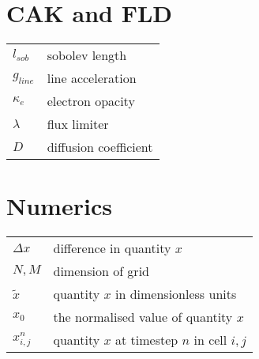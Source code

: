 \begin{multicols}{2}
\section*{CAK and FLD}
\begin{tabular}{ll}
$l_{sob}$          & sobolev length \\
$g_{line}$         & line acceleration\\
$\kappa_e$         & electron opacity \\
$\lambda$          & flux limiter \\
$D$                & diffusion coefficient\\
\end{tabular}

\section*{Numerics}
\begin{tabular}{ll}
$\Delta x$       & difference in quantity $x$\\
$N,M$            & dimension of grid \\
$\tilde{x}$      & quantity $x$ in dimensionless units \\
$x_0$		     & the normalised value of quantity $x$ \\
$x_{i,j}^n$	     & quantity $x$ at timestep $n$ in cell $i,j$ \\
\end{tabular}


\end{multicols}
